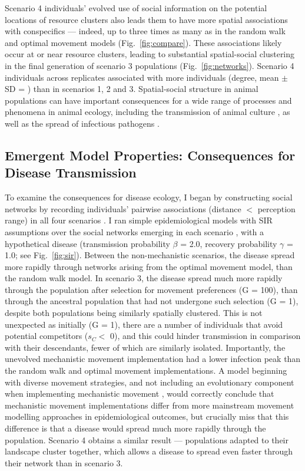 Scenario 4 individuals' evolved use of social information on the potential locations of resource clusters also leads them to have more spatial associations with conspecifics --- indeed, up to three times as many as in the random walk and optimal movement models (Fig.~\ref{fig:compare}).
These associations likely occur at or near resource clusters, leading to substantial spatial-social clustering in the final generation of scenario 3 populations (Fig.~\ref{fig:networks}).
Scenario 4 individuals across replicates associated with more individuals (degree, mean $\pm$ SD = ) than in scenarios 1, 2 and 3.
Spatial-social structure in animal populations can have important consequences for a wide range of processes and phenomena in animal ecology, including the transmission of animal culture \citep[such as foraging tactics or migration routes][]{romano2020,romano2021,jesmer2018,klump2021}, as well as the spread of infectious pathogens \citep{white2017,white2018,white2018b,webber2022,ezenwa2016,albery2020}.

\subsection*{Emergent Model Properties: Consequences for Disease Transmission}

To examine the consequences for disease ecology, I began by constructing social networks by recording individuals' pairwise associations (distance $<$ perception range) in all four scenarios \citep{farine2015}.
I ran simple epidemiological models with SIR assumptions over the social networks emerging in each scenario \citep[25 replicates per network; 1 network per scenario replicate][]{white2017,csardi2006,bailey1975}, with a hypothetical disease (transmission probability $\beta$ = 2.0, recovery probability $\gamma$ = 1.0; see Fig.~\ref{fig:sir}).
Between the non-mechanistic scenarios, the disease spread more rapidly through networks arising from the optimal movement model, than the random walk model.
In scenario 3, the disease spread much more rapidly through the population after selection for movement preferences (G = 100), than through the ancestral population that had not undergone such selection (G = 1), despite both populations being similarly spatially clustered.
This is not unexpected as initially (G = 1), there are a number of individuals that avoid potential competitors ($s_C <$ 0), and this could hinder transmission in comparison with their descendants, fewer of which are similarly isolated.
Importantly, the unevolved mechanistic movement implementation had a lower infection peak than the random walk and optimal movement implementations.
A model beginning with diverse movement strategies, and not including an evolutionary component when implementing mechanistic movement \citep[such as][]{white2018}, would correctly conclude that mechanistic movement implementations differ from more mainstream movement modelling approaches in epidemiological outcomes, but crucially miss that this difference is that a disease would spread much more rapidly through the population.
Scenario 4 obtains a similar result --- populations adapted to their landscape cluster together, which allows a disease to spread even faster through their network than in scenario 3.

